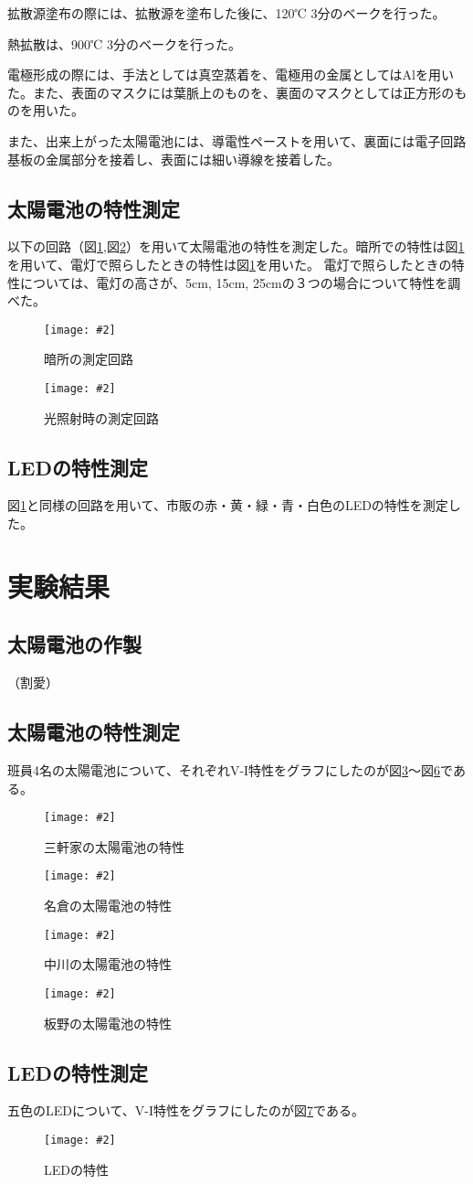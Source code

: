 \documentclass[11pt]{ltjsarticle}
\newcommand{\fig}[3]{
	\begin{figure}
		\texttt{[image: \#2]}
		\caption{#3}
		\label{#1}
	\end{figure}
}
\newcommand{\fr}[1]{図\ref{#1}}
\begin{document}
		拡散源塗布の際には、拡散源を塗布した後に、120℃ 3分のベークを行った。
		
		熱拡散は、900℃ 3分のベークを行った。
		
		電極形成の際には、手法としては真空蒸着を、電極用の金属としてはAlを用いた。また、表面のマスクには葉脈上のものを、裏面のマスクとしては正方形のものを用いた。

		また、出来上がった太陽電池には、導電性ペーストを用いて、裏面には電子回路基板の金属部分を接着し、表面には細い導線を接着した。

	\subsection{太陽電池の特性測定}
		以下の回路（\fr{fig2},\fr{fig3}）を用いて太陽電池の特性を測定した。暗所での特性は\fr{fig2}を用いて、電灯で照らしたときの特性は\fr{fig2}を用いた。
		電灯で照らしたときの特性については、電灯の高さが、5cm, 15cm, 25cmの３つの場合について特性を調べた。
		\fig{fig2}{resources/circuit/dark.png}{暗所の測定回路}
		\fig{fig3}{resources/circuit/light.png}{光照射時の測定回路}

	\subsection{LEDの特性測定}
		\fr{fig2}と同様の回路を用いて、市販の赤・黄・緑・青・白色のLEDの特性を測定した。

\section{実験結果}
	\subsection{太陽電池の作製}
		（割愛）
	\subsection{太陽電池の特性測定}
		班員4名の太陽電池について、それぞれV-I特性をグラフにしたのが\fr{fig4}〜\fr{fig7}である。
		\fig{fig4}{resources/solar/base/sangenya.png}{三軒家の太陽電池の特性}
		\fig{fig5}{resources/solar/base/nagura.png}{名倉の太陽電池の特性}
		\fig{fig6}{resources/solar/base/nakagawa.png}{中川の太陽電池の特性}
		\fig{fig7}{resources/solar/base/itano.png}{板野の太陽電池の特性}

	\subsection{LEDの特性測定}
		五色のLEDについて、V-I特性をグラフにしたのが\fr{fig8}である。
		\fig{fig8}{resources/led/led.png}{LEDの特性}
\end{document}

